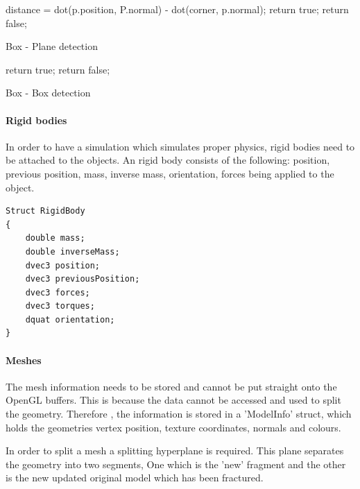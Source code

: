 \documentclass[conference,backref=page]{acmsiggraph}
\begin{document}
\begin{algorithm}
	{
		distance = dot(p.position, P.normal) - dot(corner, p.normal);
		{
			return true;
		}
	}
	return false;
	
	
	\caption{Box - Plane detection}
\end{algorithm}

\begin{algorithm}
	{
		{
			{
				{
					return true;	
				}	
			}
		}
	}
	return false;
	
	\caption{Box - Box detection}
\end{algorithm}


\paragraph{Rigid bodies} \hfill

In order to have a simulation which simulates proper physics, rigid bodies need to be attached to the objects. An rigid body consists of the following: position, previous position, mass, inverse mass, orientation, forces being applied to the object. 
\begin{lstlisting}
Struct RigidBody
{
	double mass;
	double inverseMass;
	dvec3 position;
	dvec3 previousPosition;
	dvec3 forces;
	dvec3 torques;
	dquat orientation;
}

\end{lstlisting}

\paragraph{Meshes} \hfill

The mesh information needs to be stored and cannot be put straight onto the OpenGL buffers. This is because the data cannot be accessed and used to split the geometry. Therefore , the information is stored in a 'ModelInfo' struct, which holds the geometries vertex position, texture coordinates, normals and colours.
 
In order to split a mesh a splitting hyperplane is required. This plane separates the geometry into two segments, One which is the 'new' fragment and the other is the new updated original model which has been fractured. 
\end{document}

